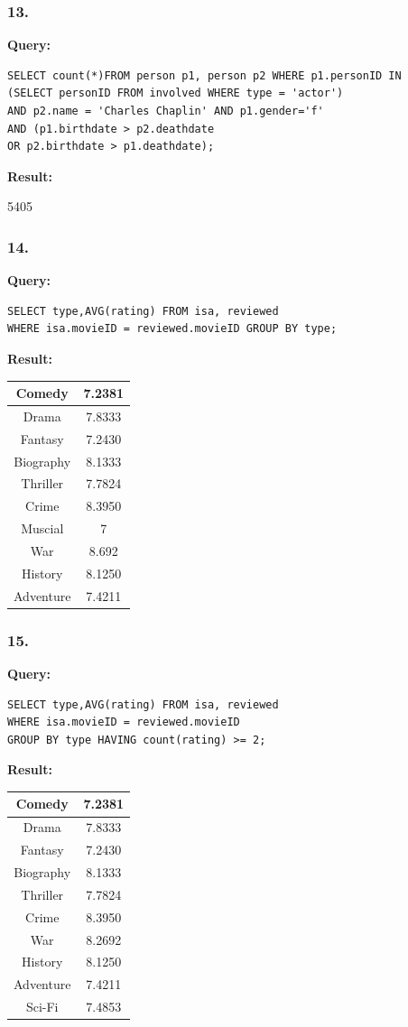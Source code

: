 \documentclass[10pt,a4paper,final]{report}
\begin{document}
\subsubsection*{13.}
\textbf{Query:}
\begin{lstlisting}
SELECT count(*)FROM person p1, person p2 WHERE p1.personID IN 
(SELECT personID FROM involved WHERE type = 'actor') 
AND p2.name = 'Charles Chaplin' AND p1.gender='f'
AND (p1.birthdate > p2.deathdate 
OR p2.birthdate > p1.deathdate);
\end{lstlisting}
\textbf{Result:}

5405

\subsubsection*{14.}
\textbf{Query:}
\begin{lstlisting}
SELECT type,AVG(rating) FROM isa, reviewed 
WHERE isa.movieID = reviewed.movieID GROUP BY type;
\end{lstlisting}
\textbf{Result:}

\begin{tabular}{|c|c|}
\hline 
Comedy & 7.2381 \\ 
\hline 
Drama & 7.8333 \\ 
\hline 
Fantasy & 7.2430 \\ 
\hline 
Biography & 8.1333 \\ 
\hline 
Thriller & 7.7824 \\ 
\hline 
Crime & 8.3950 \\ 
\hline 
Muscial & 7 \\ 
\hline 
War & 8.692 \\ 
\hline 
History & 8.1250 \\ 
\hline 
Adventure & 7.4211 \\ 
\hline 
\end{tabular} 

\subsubsection*{15.}
\textbf{Query:}
\begin{lstlisting}
SELECT type,AVG(rating) FROM isa, reviewed 
WHERE isa.movieID = reviewed.movieID 
GROUP BY type HAVING count(rating) >= 2;
\end{lstlisting}
\textbf{Result:}

\begin{tabular}{|c|c|}
\hline Comedy & 7.2381 \\ 
\hline Drama & 7.8333 \\ 
\hline Fantasy & 7.2430 \\ 
\hline Biography & 8.1333 \\ 
\hline Thriller & 7.7824 \\ 
\hline Crime & 8.3950 \\ 
\hline War & 8.2692 \\ 
\hline History & 8.1250 \\ 
\hline Adventure & 7.4211 \\ 
\hline Sci-Fi & 7.4853 \\ 
\hline 
\end{tabular}
\end{document}
